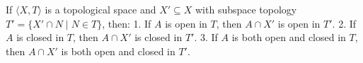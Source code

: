If $\langle X, T \rangle$ is a topological space and $X' \subseteq X$ with subspace topology $T' = \{X' \cap N \mid N \in T\}$, then:
1. If $A$ is open in $T$, then $A \cap X'$ is open in $T'$.
2. If $A$ is closed in $T$, then $A \cap X'$ is closed in $T'$.
3. If $A$ is both open and closed in $T$, then $A \cap X'$ is both open and closed in $T'$.

